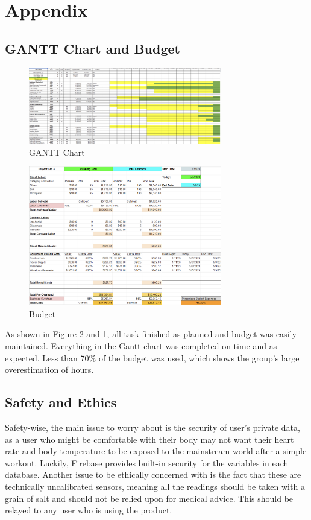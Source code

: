 \documentclass[12pt]{article}
\begin{document}
\newpage
\newpage
\section{Appendix}
\subsection{GANTT Chart and Budget}
\begin{figure}[hbt!]
    \centering
    \includegraphics[width=0.75\textwidth]{images/gantt.png}
    \caption{GANTT Chart}
    \label{gantt}
\end{figure}

\begin{figure}[hbt!]
    \centering
    \includegraphics[width=0.75\textwidth]{images/budget.png}
    \caption{Budget}
    \label{budget}
\end{figure}

   As shown in Figure \ref{budget} and \ref{gantt}, all task finished as planned and budget was easily maintained. Everything in the Gantt chart was completed on time and as expected. Less than 70\% of the budget was used, which shows the group's large overestimation of hours.

\subsection{Safety and Ethics}
    Safety-wise, the main issue to worry about is the security of user's private data, as a user who might be comfortable with their body may not want their heart rate and body temperature to be exposed to the mainstream world after a simple workout. Luckily, Firebase provides built-in security for the variables in each database. Another issue to be ethically concerned with is the fact that these are technically uncalibrated sensors, meaning all the readings should be taken with a grain of salt and should not be relied upon for medical advice. This should be relayed to any user who is using the product. 
\newpage
\printbibliography
\end{document}

